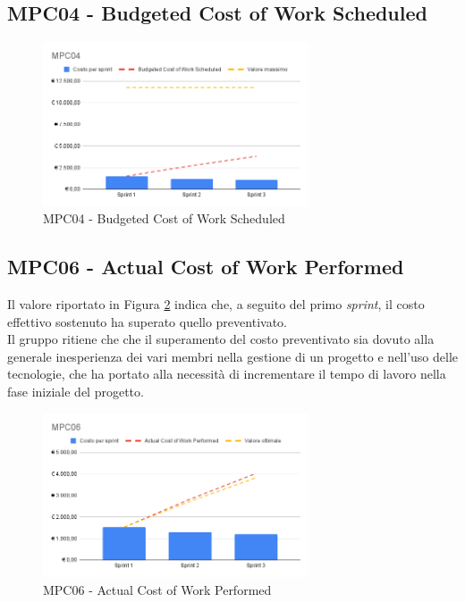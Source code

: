 \subsection{MPC04 - Budgeted Cost of Work Scheduled}
\label{s:mpc04}
\begin{figure}[htbp]
    \centering
    \includegraphics[width=0.7\textwidth]{img/MPC04.png}
    \caption{MPC04 - Budgeted Cost of Work Scheduled}
    \label{fig:mpc04}
\end{figure}

\subsection{MPC06 - Actual Cost of Work Performed}
\label{s:mpc06}
Il valore riportato in Figura \ref{fig:mpc06} indica che, a seguito del primo \textit{sprint}, il costo effettivo sostenuto ha superato quello preventivato.\\
Il gruppo ritiene che che il superamento del costo preventivato sia dovuto alla generale inesperienza dei vari membri nella gestione di un progetto e nell'uso delle tecnologie, che ha portato alla necessità di incrementare il tempo di lavoro nella fase iniziale del progetto.

\begin{figure}[htbp]
    \centering
    \includegraphics[width=0.7\textwidth]{img/MPC06.png}
    \caption{MPC06 - Actual Cost of Work Performed}
    \label{fig:mpc06}
\end{figure}

